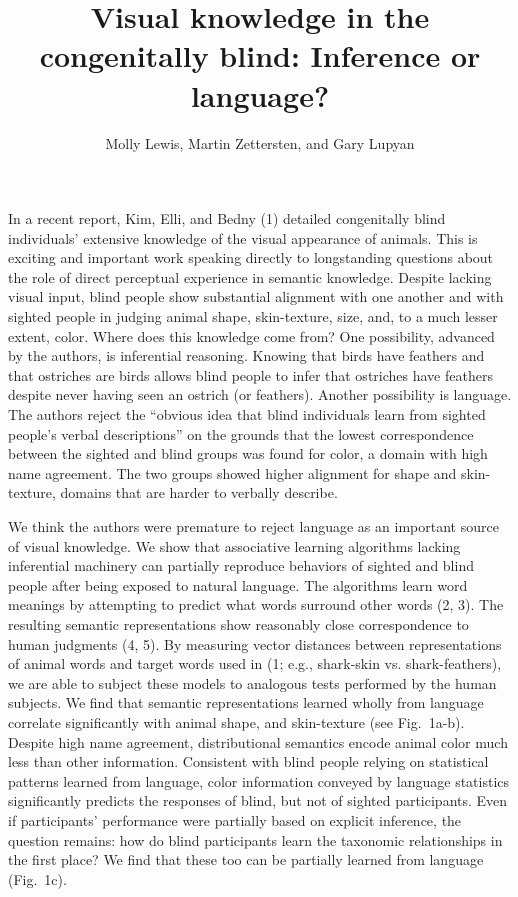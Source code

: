 \documentclass[12pt]{article}
\begin{document}
\title{\normalsize \vspace{-.5\baselineskip} \bf{Visual knowledge in the congenitally blind: Inference or language?} \vspace{-1.2\baselineskip}}
\author{\small  Molly Lewis, Martin Zettersten, and Gary Lupyan}
\date{}
\clearpage\maketitle
\thispagestyle{empty}
  \small
  


 \vspace{-1\baselineskip}
 
In a recent report, Kim, Elli, and Bedny (1) detailed congenitally blind individuals’ extensive knowledge of the visual appearance of animals. This is exciting and important work speaking directly to longstanding questions about the role of direct perceptual experience in semantic knowledge. Despite lacking visual input, blind people show substantial alignment with one another and with sighted people in judging animal shape, skin-texture, size, and, to a much lesser extent, color. Where does this knowledge come from? One possibility, advanced by the authors, is inferential reasoning. Knowing that birds have feathers and that ostriches are birds allows blind people to infer that ostriches have feathers despite never having seen an ostrich (or feathers). Another possibility is language. The authors reject the “obvious idea that blind individuals learn from sighted people's verbal descriptions” on the grounds that the lowest correspondence between the sighted and blind groups was found for color, a domain with high name agreement. The two groups showed higher alignment for shape and skin-texture, domains that are harder to verbally describe. 

We think the authors were premature to reject language as an important source of visual knowledge. We show that associative learning algorithms lacking inferential machinery can partially reproduce behaviors of sighted and blind people after being exposed to natural language. The algorithms learn word meanings by attempting to predict what words surround other words (2, 3). The resulting semantic representations show reasonably close correspondence to human judgments  (4, 5). By measuring vector distances between representations of animal words and target words used in (1; e.g., shark-skin vs. shark-feathers), we are able to subject these models to analogous tests performed by the human subjects. We find that semantic representations learned wholly from language correlate significantly with animal shape, and skin-texture (see Fig.\ 1a-b). Despite high name agreement, distributional semantics encode animal color much less than other information. Consistent with blind people relying on statistical patterns learned from language, color information conveyed by language statistics significantly predicts the responses of blind, but not of sighted participants. Even if participants’ performance were partially based on explicit inference, the question remains: how do blind participants learn the taxonomic relationships in the first place? We find that these too can be partially learned from language (Fig.\ 1c). 
\end{document}
